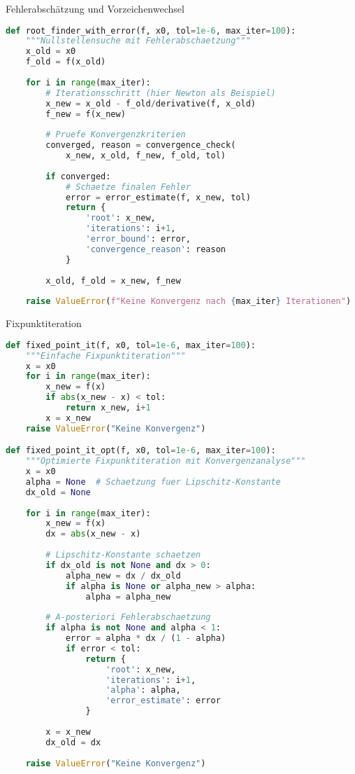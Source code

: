 \begin{examplecode}{Fehlerabschätzung und Vorzeichenwechsel}
\begin{lstlisting}[language=Python, style=basesmol]
def root_finder_with_error(f, x0, tol=1e-6, max_iter=100):
    """Nullstellensuche mit Fehlerabschaetzung"""
    x_old = x0
    f_old = f(x_old)
    
    for i in range(max_iter):
        # Iterationsschritt (hier Newton als Beispiel)
        x_new = x_old - f_old/derivative(f, x_old)
        f_new = f(x_new)
        
        # Pruefe Konvergenzkriterien
        converged, reason = convergence_check(
            x_new, x_old, f_new, f_old, tol)
            
        if converged:
            # Schaetze finalen Fehler
            error = error_estimate(f, x_new, tol)
            return {
                'root': x_new,
                'iterations': i+1,
                'error_bound': error,
                'convergence_reason': reason
            }
            
        x_old, f_old = x_new, f_new
        
    raise ValueError(f"Keine Konvergenz nach {max_iter} Iterationen")
\end{lstlisting}
\end{examplecode}

\begin{examplecode}{Fixpunktiteration}
\begin{lstlisting}[language=Python, style=basesmol]
def fixed_point_it(f, x0, tol=1e-6, max_iter=100):
    """Einfache Fixpunktiteration"""
    x = x0
    for i in range(max_iter):
        x_new = f(x)
        if abs(x_new - x) < tol:
            return x_new, i+1
        x = x_new
    raise ValueError("Keine Konvergenz")

def fixed_point_it_opt(f, x0, tol=1e-6, max_iter=100):
    """Optimierte Fixpunktiteration mit Konvergenzanalyse"""
    x = x0
    alpha = None  # Schaetzung fuer Lipschitz-Konstante
    dx_old = None
    
    for i in range(max_iter):
        x_new = f(x)
        dx = abs(x_new - x)
        
        # Lipschitz-Konstante schaetzen
        if dx_old is not None and dx > 0:
            alpha_new = dx / dx_old
            if alpha is None or alpha_new > alpha:
                alpha = alpha_new
                
        # A-posteriori Fehlerabschaetzung
        if alpha is not None and alpha < 1:
            error = alpha * dx / (1 - alpha)
            if error < tol:
                return {
                    'root': x_new,
                    'iterations': i+1,
                    'alpha': alpha,
                    'error_estimate': error
                }
        
        x = x_new
        dx_old = dx
        
    raise ValueError("Keine Konvergenz")
\end{lstlisting}
\end{examplecode}


